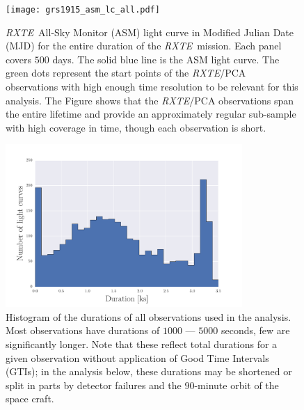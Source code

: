 \documentclass[12pt]{emulateapj}
\newcommand{\project}[1]{\textsl{#1}}
\newcommand{\rxte}{\project{RXTE}}
\begin{document}
\begin{figure}[htbp]
\begin{center}
\texttt{[image: grs1915\_asm\_lc\_all.pdf]}
\caption{\rxte\ All-Sky Monitor (ASM) light curve in Modified Julian Date (MJD) for the entire duration of the \rxte\ mission. Each panel covers $500$ days. The solid blue line is the ASM light curve. The green dots represent the start points of the \rxte/PCA observations with high enough time resolution to be relevant for this analysis. The Figure shows that the \rxte/PCA observations span the entire lifetime and provide an approximately regular sub-sample with high coverage in time, though each observation is short.}
\label{fig:asm_total}
\end{center}
\end{figure}

\begin{figure}[htbp]
\begin{center}
\includegraphics[width=9cm]{grs1915_durations.pdf}
\caption{Histogram of the durations of all observations used in the analysis. Most observations have durations of $1000$ --- $5000$ seconds, few are significantly longer. Note that these reflect total durations for a given observation without application of Good Time Intervals (GTIs); in the analysis below, these durations may be shortened or split in parts by detector failures and the $90$-minute orbit of the space craft.}
\label{fig:obsdurations}
\end{center}
\end{figure}
\end{document}
